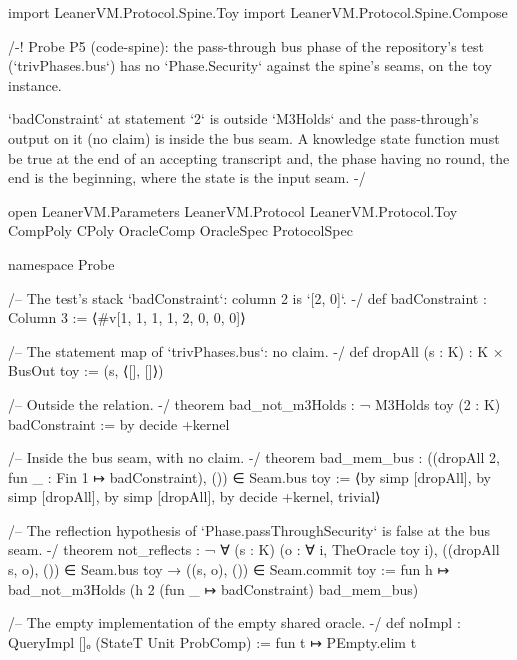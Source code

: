 \begin{leancode}
import LeanerVM.Protocol.Spine.Toy
import LeanerVM.Protocol.Spine.Compose

/-!
Probe P5 (code-spine): the pass-through bus phase of the repository's test (`trivPhases.bus`)
has no `Phase.Security` against the spine's seams, on the toy instance.

`badConstraint` at statement `2` is outside `M3Holds` and the pass-through's output on it (no
claim) is inside the bus seam. A knowledge state function must be true at the end of an
accepting transcript and, the phase having no round, the end is the beginning, where the state
is the input seam.
-/

open LeanerVM.Parameters LeanerVM.Protocol LeanerVM.Protocol.Toy CompPoly CPoly OracleComp
  OracleSpec ProtocolSpec

namespace Probe

/-- The test's stack `badConstraint`: column 2 is `[2, 0]`. -/
def badConstraint : Column 3 := ⟨#v[1, 1, 1, 1, 2, 0, 0, 0]⟩

/-- The statement map of `trivPhases.bus`: no claim. -/
def dropAll (s : K) : K × BusOut toy := (s, ⟨[], []⟩)

/-- Outside the relation. -/
theorem bad_not_m3Holds : ¬ M3Holds toy (2 : K) badConstraint := by decide +kernel

/-- Inside the bus seam, with no claim. -/
theorem bad_mem_bus :
    ((dropAll 2, fun _ : Fin 1 ↦ badConstraint), ()) ∈ Seam.bus toy :=
  ⟨by simp [dropAll], by simp [dropAll], by simp [dropAll], by decide +kernel, trivial⟩

/-- The reflection hypothesis of `Phase.passThroughSecurity` is false at the bus seam. -/
theorem not_reflects : ¬ ∀ (s : K) (o : ∀ i, TheOracle toy i),
    ((dropAll s, o), ()) ∈ Seam.bus toy → ((s, o), ()) ∈ Seam.commit toy := fun h ↦
  bad_not_m3Holds (h 2 (fun _ ↦ badConstraint) bad_mem_bus)

/-- The empty implementation of the empty shared oracle. -/
def noImpl : QueryImpl []ₒ (StateT Unit ProbComp) := fun t ↦ PEmpty.elim t


\end{leancode}
